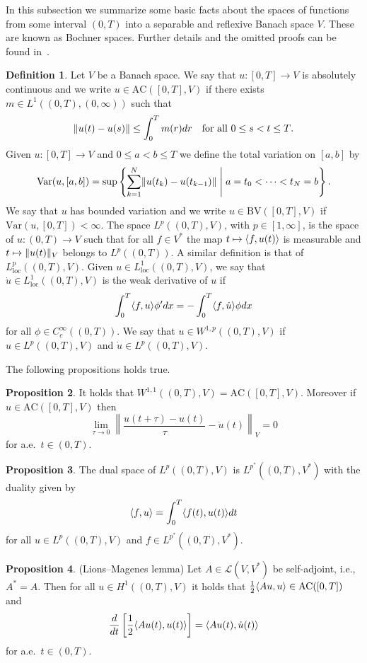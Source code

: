 \documentclass[a4paper,10pt,twoside]{amsbook}
\numberwithin{section}{chapter}
\numberwithin{equation}{chapter}
\theoremstyle{definition}
\newtheorem{prop}{Proposition}[chapter]
\newtheorem{defi}[prop]{Definition}
\DeclarePairedDelimiter{\norm}{\lVert}{\rVert}
\DeclarePairedDelimiter{\dual}{\langle}{\rangle}
\begin{document}
In this subsection we summarize some basic facts about the spaces of functions from some interval $(0,T)$ into a separable and reflexive Banach space $V$. These are known as Bochner spaces. Further details and the omitted proofs can be found in~\cite{roubicek-pde}.
\begin{defi}
\label{defi:ac-bv}
Let $V$ be a Banach space. We say that $u\colon[0,T]\to V$ is absolutely continuous and we write $u\in\text{AC}([0,T],V)$ if there exists $m\in L^1((0,T),(0,\infty))$ such that
\begin{equation*}
\norm{u(t)-u(s)}\le\int_0^Tm(r)dr\quad\text{for all $0\le s<t\le T$.}
\end{equation*}
Given $u\colon[0,T]\to V$ and $0\le a<b\le T$ we define the total variation on $[a,b]$ by
\begin{equation*}
\text{Var}(u,[a,b])=\sup\left\{\sum_{k=1}^N\norm{u(t_k)-u(t_{k-1})}\;\middle|\;a=t_0<\dots<t_N=b\right\}.
\end{equation*}
We say that $u$ has bounded variation and we write $u\in\text{BV}([0,T],V)$ if $\text{Var}(u,[0,T])<\infty$. The space $L^p((0,T),V)$, with $p\in[1,\infty]$, is the space of $u\colon(0,T)\to V$ such that for all $f\in V^*$ the map $t\mapsto\dual{f,u(t)}$ is measurable and $t\mapsto\norm{u(t)}_V$ belongs to $L^p((0,T))$. A similar definition is that of $L^p_\text{loc}((0,T),V)$. Given $u\in L^1_\text{loc}((0,T),V)$, we say that $\dot u\in L^1_\text{loc}((0,T),V)$ is the weak derivative of $u$ if
\[
\int_0^T\dual{f,u}\phi'dx=-\int_0^T\dual{f,\dot u}\phi dx
\]
for all $\phi\in C^\infty_c((0,T))$. We say that $u\in W^{1,p}((0,T),V)$ if $u\in L^p((0,T),V)$ and $\dot u\in L^p((0,T),V)$.
\end{defi}
The following propositions holds true.
\begin{prop}
\label{prop:ac-w}
It holds that $W^{1,1}((0,T),V)=\text{AC}([0,T],V)$. Moreover if $u\in\text{AC}([0,T],V)$ then
\[
\lim_{\tau\to0}\left\|\frac{u(t+\tau)-u(t)}{\tau}-\dot u(t)\right\|_V=0
\]
for a.e.\ $t\in(0,T)$.
\end{prop}
\begin{prop}
The dual space of $L^p((0,T),V)$ is $L^{p^*}((0,T),V^*)$ with the duality given by
\[
\dual{f,u}=\int_0^T\dual{f(t),u(t)}dt
\]
for all $u\in L^p((0,T),V)$ and $f\in L^{p^*}((0,T),V^*)$.
\end{prop}
\begin{prop}(Lions--Magenes lemma)
\label{prop:lions-magenes}
Let $A\in\mathscr{L}(V,V^*)$ be self-adjoint, i.e., $A^*=A$. Then for all $u\in H^1((0,T),V)$ it holds that $\frac{1}{2}\dual{Au,u}\in\text{AC}([0,T])$ and
\[
\frac{d}{dt}\left[\frac{1}{2}\dual{Au(t),u(t)}\right]=\dual{Au(t),\dot u(t)}
\]
for a.e.\ $t\in(0,T)$.
\end{prop}
\end{document}
